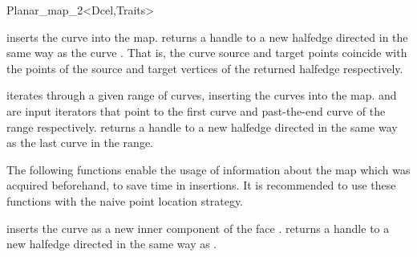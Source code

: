 \begin{ccRefClass}{Planar_map_2<Dcel,Traits>}
\ccModifiers

  {inserts the curve  into the map.  returns 
   a handle to a new halfedge directed in the same way as the curve . 
   That is, the curve source and target points coincide with the points of the 
   source and target vertices of the returned halfedge respectively.
  }                

  {iterates through a given range of curves, inserting the curves into the
   map.  and  are input iterators that point to the first
   curve and past-the-end curve of the range respectively.  
   returns a handle to a new halfedge directed in the same way as the last 
   curve in the range.
  }

\begin{ccAdvanced}


The following functions enable the usage of information about the map which 
was acquired beforehand, to save time in insertions. It is recommended to use
these functions with the naive point location strategy.
    
  {inserts the curve  as a new inner component of the face . 
    returns a handle to a new halfedge directed
   in the same way as .
  }


\end{ccAdvanced}
\end{ccRefClass}
